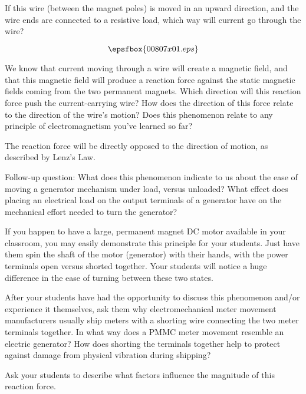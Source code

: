 

If this wire (between the magnet poles) is moved in an upward direction, and the wire ends are connected to a resistive load, which way will current go through the wire?

$$\epsfbox{00807x01.eps}$$

We know that current moving through a wire will create a magnetic field, and that this magnetic field will produce a reaction force against the static magnetic fields coming from the two permanent magnets.  Which direction will this reaction force push the current-carrying wire?  How does the direction of this force relate to the direction of the wire's motion?  Does this phenomenon relate to any principle of electromagnetism you've learned so far?







The reaction force will be directly opposed to the direction of motion, as described by Lenz's Law.

\vskip 10pt

Follow-up question: What does this phenomenon indicate to us about the ease of moving a generator mechanism under load, versus unloaded?  What effect does placing an electrical load on the output terminals of a generator have on the mechanical effort needed to turn the generator?







If you happen to have a large, permanent magnet DC motor available in your classroom, you may easily demonstrate this principle for your students.  Just have them spin the shaft of the motor (generator) with their hands, with the power terminals open versus shorted together.  Your students will notice a huge difference in the ease of turning between these two states.

After your students have had the opportunity to discuss this phenomenon and/or experience it themselves, ask them why electromechanical meter movement manufacturers usually ship meters with a shorting wire connecting the two meter terminals together.  In what way does a PMMC meter movement resemble an electric generator?  How does shorting the terminals together help to protect against damage from physical vibration during shipping?

Ask your students to describe what factors influence the magnitude of this reaction force.



